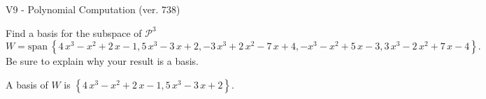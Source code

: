 \begin{exercise}
  \begin{exerciseTitle}V9 - Polynomial Computation (ver. 738)\end{exerciseTitle}
  \begin{exerciseStatement}
    Find a basis for the subspace of \(\mathcal{P}^3\) 
\[W=\mathrm{span}\ \left\{4 \, x^{3} - x^{2} + 2 \, x - 1 , 5 \, x^{3} - 3 \, x + 2 , -3 \, x^{3} + 2 \, x^{2} - 7 \, x + 4 , -x^{3} - x^{2} + 5 \, x - 3 , 3 \, x^{3} - 2 \, x^{2} + 7 \, x - 4\right\}.\]
 Be sure to explain why your result is a basis.


  \end{exerciseStatement}
  \begin{exerciseAnswer}
   A basis of \(W\) is  \(\left\{4 \, x^{3} - x^{2} + 2 \, x - 1 , 5 \, x^{3} - 3 \, x + 2\right\}\).
  


  \end{exerciseAnswer}
\end{exercise}